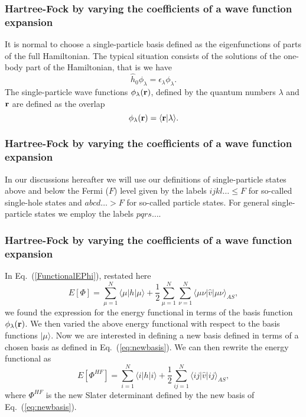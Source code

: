 \documentclass{beamer}
\begin{document}
\begin{frame}
\frametitle{Hartree-Fock by varying the coefficients of a wave function expansion}

\begin{block}{}
It is normal to choose a single-particle basis defined as the eigenfunctions
of parts of the full Hamiltonian. The typical situation consists of the solutions of the one-body part of the Hamiltonian, that is we have
\[
\hat{h}_0\phi_{\lambda}=\epsilon_{\lambda}\phi_{\lambda}.
\]
The single-particle wave functions $\phi_{\lambda}({\bf r})$, defined by the quantum numbers $\lambda$ and ${\bf r}$
are defined as the overlap 
\[
   \phi_{\lambda}({\bf r})  = \langle {\bf r} | \lambda \rangle .
\]
\end{block}
\end{frame}

\begin{frame}
\frametitle{Hartree-Fock by varying the coefficients of a wave function expansion}

\begin{block}{}
In our discussions hereafter we will use our definitions of single-particle states above and below the Fermi ($F$) level given by the labels
$ijkl\dots \le F$ for so-called single-hole states and $abcd\dots > F$ for so-called particle states.
For general single-particle states we employ the labels $pqrs\dots$. 
\end{block}
\end{frame}

\begin{frame}
\frametitle{Hartree-Fock by varying the coefficients of a wave function expansion}

\begin{block}{}
In Eq.~(\ref{FunctionalEPhi}), restated here
\[
  E[\Phi] 
  = \sum_{\mu=1}^N \langle \mu | h | \mu \rangle +
  \frac{1}{2}\sum_{{\mu}=1}^N\sum_{{\nu}=1}^N \langle \mu\nu|\hat{v}|\mu\nu\rangle_{AS},
\]
we found the expression for the energy functional in terms of the basis function $\phi_{\lambda}({\bf r})$. We then  varied the above energy functional with respect to the basis functions $|\mu \rangle$. 
Now we are interested in defining a new basis defined in terms of
a chosen basis as defined in Eq.~(\ref{eq:newbasis}). We can then rewrite the energy functional as
\begin{equation}
  E[\Phi^{HF}] 
  = \sum_{i=1}^N \langle i | h | i \rangle +
  \frac{1}{2}\sum_{ij=1}^N\langle ij|\hat{v}|ij\rangle_{AS}, \label{FunctionalEPhi2}
\end{equation}
where $\Phi^{HF}$ is the new Slater determinant defined by the new basis of Eq.~(\ref{eq:newbasis}). 
\end{block}
\end{frame}
\end{document}
